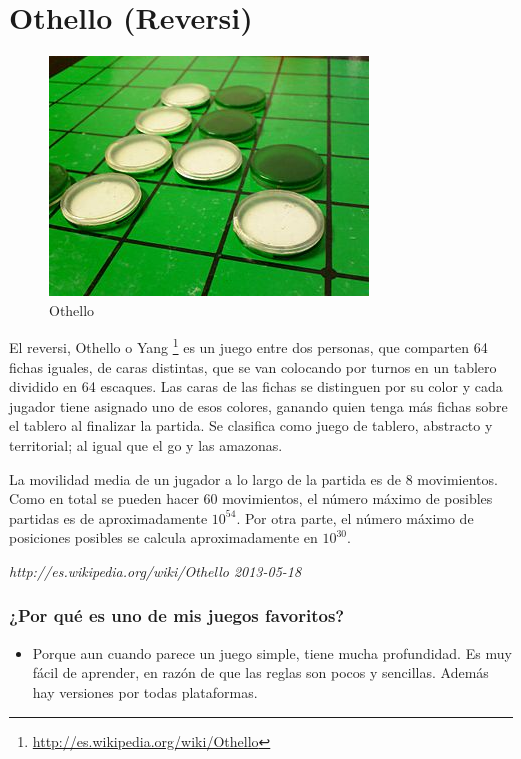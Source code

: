 \section{Othello (Reversi)}

\begin{figure}[htbp]
\begin{center}
\includegraphics[width=.60\textwidth]{./imagenes/othello.jpg}
\caption{Othello}
\label{Othello}
\end{center}
\end{figure}
El reversi, Othello o Yang \footnote{\url{http://es.wikipedia.org/wiki/Othello}} es un juego entre dos personas, que comparten 64 fichas iguales, de caras distintas, que se van colocando por turnos en un tablero dividido en 64 escaques. Las caras de las fichas se distinguen por su color y cada jugador tiene asignado uno de esos colores, ganando quien tenga más fichas sobre el tablero al finalizar la partida. Se clasifica como juego de tablero, abstracto y territorial; al igual que el go y las amazonas.

La movilidad media de un jugador a lo largo de la partida es de 8 movimientos. Como en total se pueden hacer 60 movimientos, el número máximo de posibles partidas es de aproximadamente $10^{54}$. Por otra parte, el número máximo de posiciones posibles se calcula aproximadamente en $10^{30}$.

\emph{http://es.wikipedia.org/wiki/Othello 2013-05-18}

\subsubsection{¿Por qué es uno de mis juegos favoritos?}
\begin{itemize}
	\item Porque aun cuando parece un juego simple, tiene mucha profundidad. Es muy fácil de aprender, en razón de que las reglas son pocos y sencillas. Además hay versiones por todas plataformas.
\end{itemize}

